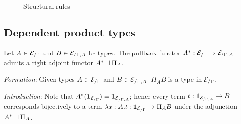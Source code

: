 \documentclass[a4paper]{article}
\begin{document}
\begin{figure}
  \centering
  \begin{mathpar}
  \end{mathpar}
  \caption{Structural rules}
  \label{fig:0001}
\end{figure}

\subsection{Dependent product types}

Let $A \in \Sl{\cE}{\Gamma}$ and $B \in \Sl{\cE}{\Gamma,A}$ be types.
The pullback functor $\pb{A} : \Sl{\cE}{\Gamma} \to \Sl{\cE}{\Gamma,A}$ admits a right adjoint functor $\pb{A} \adj \Pi_{A}$.

\emph{Formation}: Given types $A \in \Sl{\cE}{\Gamma}$ and $B \in \Sl{\cE}{\Gamma,A}$, $\Pi_{A}B$ is a type in $\Sl{\cE}{\Gamma}$.

\emph{Introduction}: Note that $\pb{A}(\termObj{\Sl{\cE}{\Gamma}}) = \termObj{\Sl{\cE}{\Gamma,A}}$; hence every term $t : \termObj{\Sl{\cE}{\Gamma,A}} \to B$ corresponds bijectively to a term $\lambda x : A.t : \termObj{\Sl{\cE}{\Gamma}} \to \Pi_AB$ under the adjunction $\pb{A} \adj \Pi_A$.
\end{document}
